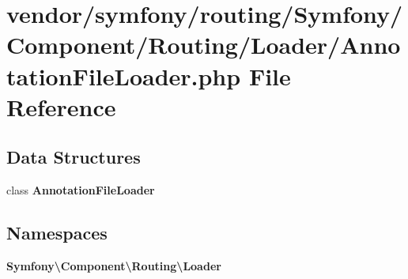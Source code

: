 \section{vendor/symfony/routing/\+Symfony/\+Component/\+Routing/\+Loader/\+Annotation\+File\+Loader.php File Reference}
\label{_annotation_file_loader_8php}
\subsection*{Data Structures}
\begin{DoxyCompactItemize}
\item 
class {\bf Annotation\+File\+Loader}
\end{DoxyCompactItemize}
\subsection*{Namespaces}
\begin{DoxyCompactItemize}
\item 
 {\bf Symfony\textbackslash{}\+Component\textbackslash{}\+Routing\textbackslash{}\+Loader}
\end{DoxyCompactItemize}

